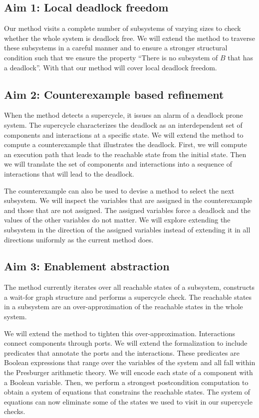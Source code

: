 \subsection{Aim 1: Local deadlock freedom} 

Our method visits a complete number of 
subsystems of varying sizes to check whether
the whole system is deadlock free. 
We will extend the method to traverse these subsystems
in a careful manner and to ensure a stronger structural 
condition such that we ensure the property 
``There is no subsystem of $B$ that has a deadlock''. 
With that our method will cover local deadlock freedom. 

\subsection{Aim 2: Counterexample based refinement} 

When the method detects a supercycle, it issues an alarm of a 
deadlock prone system. 
The supercycle characterizes the deadlock as an interdependent 
set of components and interactions
at a specific state. 
We will extend the method to compute a counterexample
that illustrates the deadlock. 
First, we will compute an execution path that leads 
to the reachable state from the initial state. 
Then we will translate the set of components and interactions
into a sequence of interactions that will lead to the deadlock. 

The counterexample can also be used to devise a method to
select the next subsystem. 
We will inspect the variables that are assigned
in the counterexample and those that are not assigned. 
The assigned variables force a deadlock and the values of the
other variables do not matter. 
We will explore extending the subsystem in the direction of 
the assigned 
variables instead of extending it in all directions uniformly 
as the current method does. 

\subsection{Aim 3: Enablement abstraction } 

The method currently iterates over all reachable states of
a subsystem, constructs a wait-for graph structure and 
performs a supercycle check. 
The reachable states in a subsystem are an over-approximation
of the reachable states in the whole system. 

We will extend the method to tighten this over-approximation. 
Interactions connect components through ports. 
%
We will extend the formalization to include predicates 
that annotate the ports and the interactions. 
These predicates are Boolean expressions that range over the
variables of the system and all fall within 
the Presburger arithmetic theory. 
%
We will encode each state of a component with a Boolean 
variable.
Then, we perform a strongest postcondition computation to 
obtain a system of equations that constrains the reachable 
states.
%
The system of equations can now eliminate some of the states
we used to visit in our supercycle checks. 

